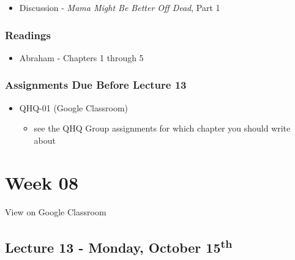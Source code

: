 \documentclass[]{book}
\providecommand{\tightlist}{%
  \setlength{\itemsep}{0pt}\setlength{\parskip}{0pt}}
\theoremstyle{definition}
\theoremstyle{definition}
\theoremstyle{definition}
\theoremstyle{remark}
\begin{document}
\begin{itemize}
\tightlist
\item
  Discussion - \emph{Mama Might Be Better Off Dead}, Part 1
\end{itemize}

\hypertarget{readings-12}{%
\subsubsection*{Readings}\label{readings-12}}

\begin{itemize}
\tightlist
\item
  Abraham - Chapters 1 through 5
\end{itemize}

\hypertarget{assignments-due-before-lecture-13}{%
\subsubsection*{Assignments Due Before Lecture
13}\label{assignments-due-before-lecture-13}}

\begin{itemize}
\tightlist
\item
  QHQ-01 (Google Classroom)

  \begin{itemize}
  \tightlist
  \item
    see the QHQ Group assignments for which chapter you should write
    about
  \end{itemize}
\end{itemize}

\hypertarget{week-08}{%
\section*{Week 08}\label{week-08}}

View on Google Classroom

\hypertarget{lecture-13---monday-october-15th}{%
\subsection*{\texorpdfstring{Lecture 13 - Monday, October
15\textsuperscript{th}}{Lecture 13 - Monday, October 15th}}\label{lecture-13---monday-october-15th}}
\end{document}

